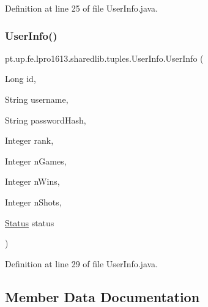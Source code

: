 Definition at line 25 of file User\+Info.\+java.

\hypertarget{classpt_1_1up_1_1fe_1_1lpro1613_1_1sharedlib_1_1tuples_1_1_user_info_a80758aac23c486720cefc72616b8550b}{}\label{classpt_1_1up_1_1fe_1_1lpro1613_1_1sharedlib_1_1tuples_1_1_user_info_a80758aac23c486720cefc72616b8550b} 
\subsubsection{\texorpdfstring{User\+Info()}{UserInfo()}\hspace{0.1cm}{\footnotesize\ttfamily [3/3]}}
{\footnotesize\ttfamily pt.\+up.\+fe.\+lpro1613.\+sharedlib.\+tuples.\+User\+Info.\+User\+Info (\begin{DoxyParamCaption}\item[{Long}]{id,  }\item[{String}]{username,  }\item[{String}]{password\+Hash,  }\item[{Integer}]{rank,  }\item[{Integer}]{n\+Games,  }\item[{Integer}]{n\+Wins,  }\item[{Integer}]{n\+Shots,  }\item[{\hyperlink{enumpt_1_1up_1_1fe_1_1lpro1613_1_1sharedlib_1_1tuples_1_1_user_info_1_1_status}{Status}}]{status }\end{DoxyParamCaption})}



Definition at line 29 of file User\+Info.\+java.



\subsection{Member Data Documentation}
\hypertarget{classpt_1_1up_1_1fe_1_1lpro1613_1_1sharedlib_1_1tuples_1_1_user_info_a580b595dffa17b574af65299fd921deb}{}\label{classpt_1_1up_1_1fe_1_1lpro1613_1_1sharedlib_1_1tuples_1_1_user_info_a580b595dffa17b574af65299fd921deb} 
